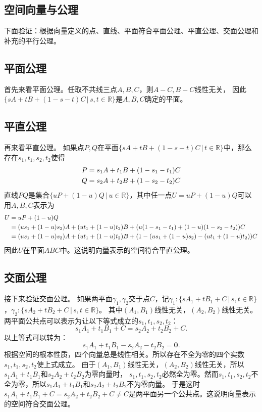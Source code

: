 \documentclass[12pt,UTF8]{ctexbook}
\begin{document}
\begin{appendix}
\chapter{空间向量与公理}

下面验证：根据向量定义的点、直线、平面符合平面公理、平直公理、交面公理和补充的平行公理。

\section{平面公理}
首先来看平面公理。任取不共线三点$A,B,C$，则$A-C,B-C$线性无关，
因此$ \{sA+tB+(1 - s - t)C \, | \,s, t\in\mathbb{R}\}$是$A,B,C$确定的平面。

\section{平直公理}
再来看平直公理。
如果点$P,Q$在平面$ \{sA+tB+(1 - s - t)C \, | \, t\in\mathbb{R}\}$中，那么存在$s_1, t_1, s_2, t_2$使得
\begin{align}
P &= s_1A + t_1B + (1 - s_1 - t_1)C \notag \\
Q &= s_2A + t_2B + (1 - s_2 - t_2)C \notag 
\end{align}
直线$PQ$是集合$\{uP+(1-u)Q \, | \, u\in \mathbb{R}\}$，其中任一点$U = uP+(1-u)Q$可以用$A,B,C$表示为
\begin{align}
U &= uP+(1-u)Q \notag \\
&= (us_1 + (1-u)s_2)A + (ut_1 + (1-u)t_2)B + (u(1 - s_1 - t_1) + (1-u)(1 - s_2 - t_2))C  \notag \\
&= (us_1 + (1-u)s_2)A + (ut_1 + (1-u)t_2)B + (1 - (us_1 + (1-u)s_2) - (ut_1 + (1-u)t_2))C \notag
\end{align}
因此$U$在平面$ABC$中。这说明向量表示的空间符合平直公理。

\section{交面公理}
接下来验证交面公理。
如果两平面$\gamma_1, \gamma_2$交于点$C$，记$\gamma_1: \{sA_1+tB_1+C\, | \, s,t\in\mathbb{R}\}$，$\gamma_2: \{sA_2+tB_2+C\, | \, s,t\in\mathbb{R}\}$。
其中$(A_1,B_1)$线性无关，$(A_2,B_2)$线性无关。两平面公共点可以表示为让以下等式成立的$s_1,t_1,s_2,t_2$：
$$ s_1A_1+t_1B_1+C = s_2A_2+t_2B_2+C. $$
以上等式可以转为：
$$ s_1A_1+t_1B_1 - s_2A_2 - t_2B_2 = \mathbf{0}. $$
根据空间的根本性质，四个向量总是线性相关。所以存在不全为零的四个实数$s_1,t_1,s_2,t_2$使上式成立。
由于$(A_1,B_1)$线性无关，$(A_2,B_2)$线性无关，所以$s_1A_1+t_1B_1$和$s_2A_2 + t_2B_2$为零向量时，
$s_1,t_1,s_2,t_2$必然全为零。然而$s_1,t_1,s_2,t_2$不全为零，所以$s_1A_1+t_1B_1$和$s_2A_2 + t_2B_2$不为零向量。
于是这时$s_1A_1+t_1B_1+C = s_2A_2+t_2B_2+C\neq C$是两平面另一个公共点。这说明向量表示的空间符合交面公理。


\end{appendix}
\end{document}
